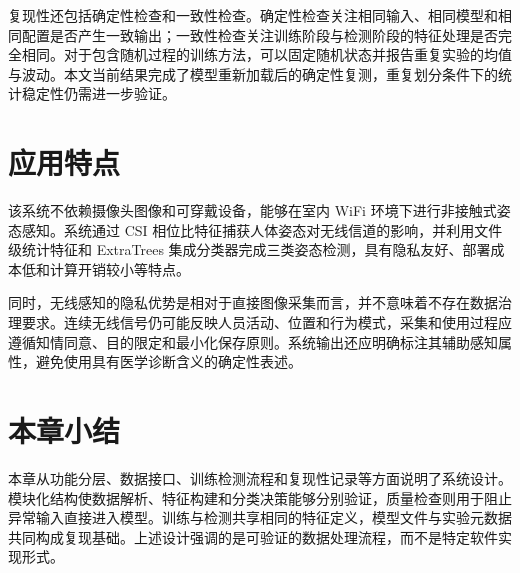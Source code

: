 复现性还包括确定性检查和一致性检查。确定性检查关注相同输入、相同模型和相同配置是否产生一致输出；一致性检查关注训练阶段与检测阶段的特征处理是否完全相同。对于包含随机过程的训练方法，可以固定随机状态并报告重复实验的均值与波动。本文当前结果完成了模型重新加载后的确定性复测，重复划分条件下的统计稳定性仍需进一步验证。

\section{应用特点}
该系统不依赖摄像头图像和可穿戴设备，能够在室内 WiFi 环境下进行非接触式姿态感知。系统通过 CSI 相位比特征捕获人体姿态对无线信道的影响，并利用文件级统计特征和 ExtraTrees 集成分类器完成三类姿态检测，具有隐私友好、部署成本低和计算开销较小等特点。

同时，无线感知的隐私优势是相对于直接图像采集而言，并不意味着不存在数据治理要求。连续无线信号仍可能反映人员活动、位置和行为模式，采集和使用过程应遵循知情同意、目的限定和最小化保存原则。系统输出还应明确标注其辅助感知属性，避免使用具有医学诊断含义的确定性表述。

\section{本章小结}
本章从功能分层、数据接口、训练检测流程和复现性记录等方面说明了系统设计。模块化结构使数据解析、特征构建和分类决策能够分别验证，质量检查则用于阻止异常输入直接进入模型。训练与检测共享相同的特征定义，模型文件与实验元数据共同构成复现基础。上述设计强调的是可验证的数据处理流程，而不是特定软件实现形式。


